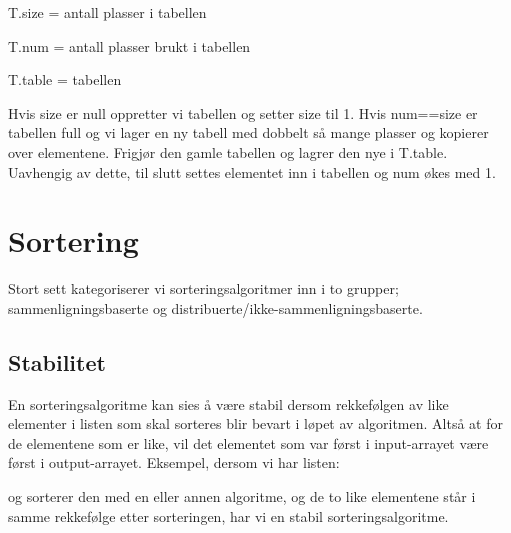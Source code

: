 \documentclass[12pt]{report}
\begin{document}
\par

T.size = antall plasser i tabellen\par

T.num = antall plasser brukt i tabellen\par

T.table = tabellen\par


\vspace{\baselineskip}
Hvis size er null oppretter vi tabellen og setter size til 1. Hvis num==size er tabellen full og vi lager en ny tabell med dobbelt så mange plasser og kopierer over elementene. Frigjør den gamle tabellen og lagrer den nye i T.table. Uavhengig av dette, til slutt settes elementet inn i tabellen og num økes med 1. 


\newpage
\par

\section*{Sortering}
Stort sett kategoriserer vi sorteringsalgoritmer inn i to grupper; sammenligningsbaserte og distribuerte/ikke-sammenligningsbaserte.\par


\vspace{\baselineskip}
\subsection*{Stabilitet}
En sorteringsalgoritme kan sies å være stabil dersom rekkefølgen av like elementer i listen som skal sorteres blir bevart i løpet av algoritmen. Altså at for de elementene som er like, vil det elementet som var først i input-arrayet være først i output-arrayet.  Eksempel, dersom vi har listen:\par

\begin{Center}
[B1,C1,C2,A1]
\end{Center}\par

og sorterer den med en eller annen algoritme, og de to like elementene står i samme rekkefølge etter sorteringen, har vi en stabil sorteringsalgoritme.\par
\end{document}
